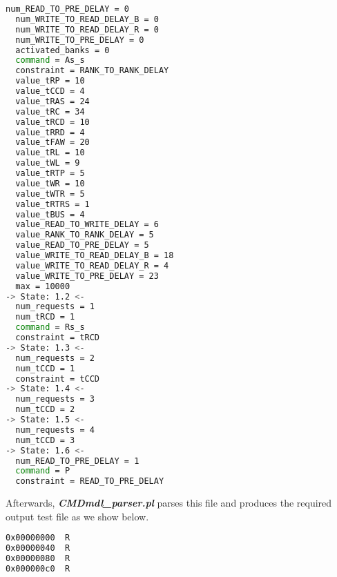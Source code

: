 \begin{lstlisting}[language=bash]
  num_READ_TO_PRE_DELAY = 0
  num_WRITE_TO_READ_DELAY_B = 0
  num_WRITE_TO_READ_DELAY_R = 0
  num_WRITE_TO_PRE_DELAY = 0
  activated_banks = 0
  command = As_s
  constraint = RANK_TO_RANK_DELAY
  value_tRP = 10
  value_tCCD = 4
  value_tRAS = 24
  value_tRC = 34
  value_tRCD = 10
  value_tRRD = 4
  value_tFAW = 20
  value_tRL = 10
  value_tWL = 9
  value_tRTP = 5
  value_tWR = 10
  value_tWTR = 5
  value_tRTRS = 1
  value_tBUS = 4
  value_READ_TO_WRITE_DELAY = 6
  value_RANK_TO_RANK_DELAY = 5
  value_READ_TO_PRE_DELAY = 5
  value_WRITE_TO_READ_DELAY_B = 18
  value_WRITE_TO_READ_DELAY_R = 4
  value_WRITE_TO_PRE_DELAY = 23
  max = 10000
-> State: 1.2 <-
  num_requests = 1
  num_tRCD = 1
  command = Rs_s
  constraint = tRCD
-> State: 1.3 <-
  num_requests = 2
  num_tCCD = 1
  constraint = tCCD
-> State: 1.4 <-
  num_requests = 3
  num_tCCD = 2
-> State: 1.5 <-
  num_requests = 4
  num_tCCD = 3
-> State: 1.6 <-
  num_READ_TO_PRE_DELAY = 1
  command = P
  constraint = READ_TO_PRE_DELAY
\end{lstlisting} 

Afterwards, \textbf{\textit{CMDmdl\_parser.pl}} parses this file and produces the required output test file as we show below. 
\begin{lstlisting}[language=bash]
0x00000000	R
0x00000040	R
0x00000080	R
0x000000c0	R
\end{lstlisting} 